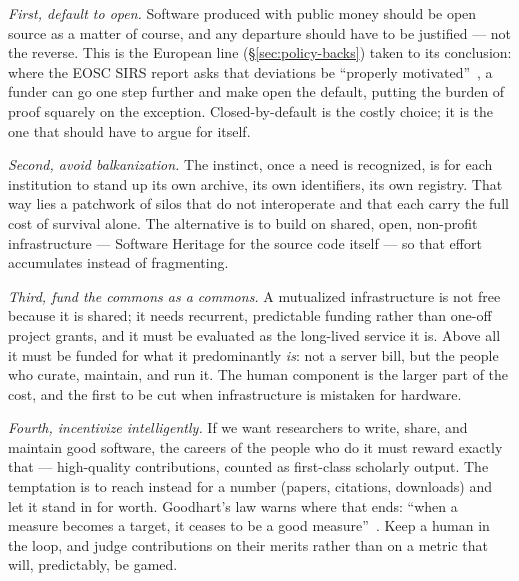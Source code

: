 \emph{First, default to open.} Software produced with public money should be open source as a matter
of course, and any departure should have to be justified --- not the reverse. This is the European
line (\S\ref{sec:policy-backs}) taken to its conclusion: where the EOSC SIRS report asks that
deviations be \enquote{properly motivated}~\autocite{SIRSReport2020}, a funder can go one step
further and make open the default, putting the burden of proof squarely on the exception.
Closed-by-default is the costly choice; it is the one that should have to argue for itself.

\emph{Second, avoid balkanization.} The instinct, once a need is recognized, is for each institution
to stand up its own archive, its own identifiers, its own registry. That way lies a patchwork of
silos that do not interoperate and that each carry the full cost of survival alone. The alternative
is to build on shared, open, non-profit infrastructure --- Software Heritage for the source code
itself --- so that effort accumulates instead of fragmenting.

\emph{Third, fund the commons as a commons.} A mutualized infrastructure is not free because it is
shared; it needs recurrent, predictable funding rather than one-off project grants, and it must be
evaluated as the long-lived service it is. Above all it must be funded for what it predominantly
\emph{is}: not a server bill, but the people who curate, maintain, and run it. The human component is
the larger part of the cost, and the first to be cut when infrastructure is mistaken for hardware.

\emph{Fourth, incentivize intelligently.} If we want researchers to write, share, and maintain good
software, the careers of the people who do it must reward exactly that --- high-quality
contributions, counted as first-class scholarly output. The temptation is to reach instead for a
number (papers, citations, downloads) and let it stand in for worth. Goodhart's law warns where that
ends: \enquote{when a measure becomes a target, it ceases to be a good
measure}~\autocite{strathern1997improving}. Keep a human in the loop, and judge contributions on
their merits rather than on a metric that will, predictably, be gamed.

